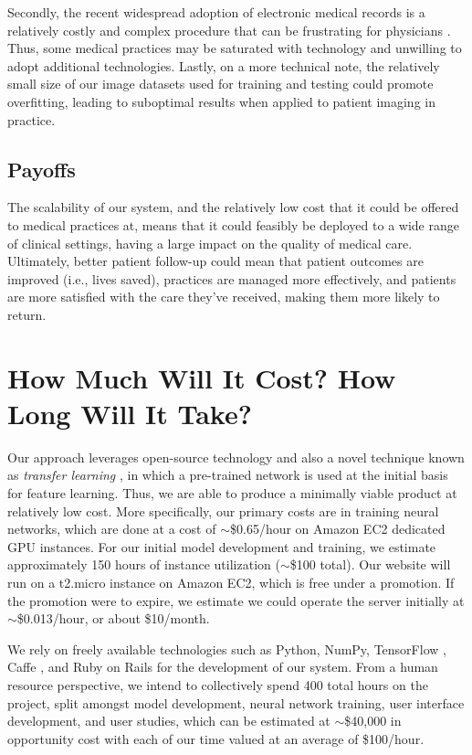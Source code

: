 \documentclass[a4paper,10pt]{article}
\begin{document}
Secondly, the recent widespread adoption of electronic medical records is
a relatively costly and complex procedure that can be frustrating for
physicians \cite{boonstra2014implementing}. Thus, some medical practices may
be saturated with technology and unwilling to adopt additional technologies.
Lastly, on a more technical note, the relatively small size of our image
datasets used for training and testing could promote overfitting, leading
to suboptimal results when applied to patient imaging in practice.

\subsection{Payoffs}
The scalability of our system, and the relatively low cost that it could be
offered to medical practices at, means that it could feasibly be deployed to a
wide range of clinical settings, having a large impact on the quality of medical
care. Ultimately, better patient follow-up could mean that patient outcomes are
improved (i.e., lives saved), practices are managed more effectively, and
patients are more satisfied with the care they've received, making them more
likely to return.

\section{How Much Will It Cost? How Long Will It Take?}
Our approach leverages open-source technology and also a novel technique known
as \textit{transfer learning} \cite{razavian2014cnn}, in which a pre-trained
network is used at the initial basis for feature learning. Thus, we are able to
produce a minimally viable product at relatively low cost. More specifically,
our primary costs are in training neural networks, which are done at a cost of
$\sim$\$0.65/hour on Amazon EC2 dedicated GPU instances. For our initial model
development and training, we estimate approximately 150 hours of instance
utilization ($\sim$\$100 total). Our website will run on a t2.micro instance on
Amazon EC2, which is free under a promotion. If the promotion were to expire,
we estimate we could operate the server initially at $\sim$\$0.013/hour, or
about \$10/month.

We rely on freely available technologies such as Python, NumPy, TensorFlow
\cite{tensorflow2015-whitepaper}, Caffe \cite{jia2014caffe}, and Ruby on Rails
for the development of our system. From a human resource perspective, we intend
to collectively spend 400 total hours on the project, split amongst model
development, neural network training, user interface development, and user
studies, which can be estimated at $\sim$\$40,000 in opportunity cost with
each of our time valued at an average of \$100/hour.
\end{document}
